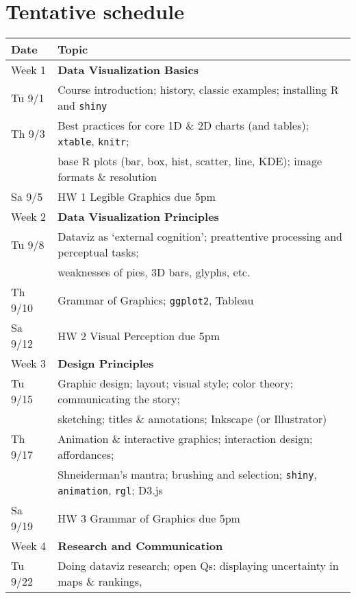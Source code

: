 \documentclass[12pt]{article}
\begin{document}
\section*{Tentative schedule}
\begin{table}[h!]
\begin{tabular}{ll}
\textbf{Date} & \textbf{Topic}  \\ \hline
Week 1		& \textbf{Data Visualization Basics} \\
Tu 9/1           & Course introduction; history, classic examples; installing R and \texttt{shiny} \\
Th 9/3			  & Best practices for core 1D \& 2D charts (and tables); \texttt{xtable}, \texttt{knitr}; \\ 
              & base R plots (bar, box, hist, scatter, line, KDE); image formats \& resolution \\
Sa 9/5        & HW 1 Legible Graphics due 5pm \\ \hline
Week 2		& \textbf{Data Visualization Principles} \\
Tu 9/8        & Dataviz as `external cognition'; preattentive processing and perceptual tasks; \\
              & weaknesses of pies, 3D bars, glyphs, etc.\ \\
Th 9/10       & Grammar of Graphics; \texttt{ggplot2}, Tableau \\
Sa 9/12       & HW 2 Visual Perception due 5pm \\ \hline
Week 3		& \textbf{Design Principles} \\
Tu 9/15			  & Graphic design; layout; visual style; color theory; communicating the story; \\
              & sketching; titles \& annotations; Inkscape (or Illustrator) \\
Th 9/17       & Animation \& interactive graphics; interaction design; affordances; \\
              & Shneiderman's mantra; brushing and selection; \texttt{shiny}, \texttt{animation}, \texttt{rgl}; D3.js \\ 
Sa 9/19       & HW 3 Grammar of Graphics due 5pm \\ \hline
Week 4		& \textbf{Research and Communication} \\
Tu 9/22       & Doing dataviz research; open Qs: displaying uncertainty in maps \& rankings, \\

\end{tabular}
\end{table}
\end{document}
